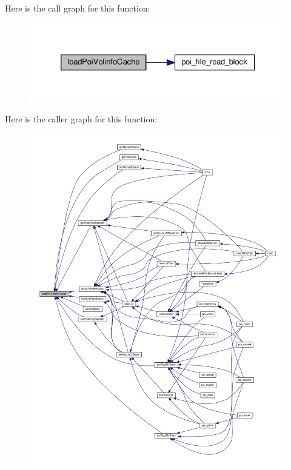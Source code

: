 Here is the call graph for this function\-:\nopagebreak
\begin{figure}[H]
\begin{center}
\leavevmode
\includegraphics[width=324pt]{volume-information_8h_af6d08c2f02ba561e21c8aeef199e20f2_cgraph}
\end{center}
\end{figure}




Here is the caller graph for this function\-:
\nopagebreak
\begin{figure}[H]
\begin{center}
\leavevmode
\includegraphics[width=350pt]{volume-information_8h_af6d08c2f02ba561e21c8aeef199e20f2_icgraph}
\end{center}
\end{figure}


